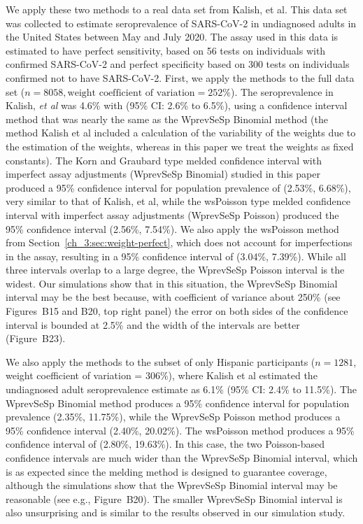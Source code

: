 We apply these two methods to a real data set from Kalish, et al.\cite{Kali:2021}
This data set was collected to estimate seroprevalence of SARS-CoV-2 in undiagnosed adults in the United States between May and July 2020.
The assay used in this data is estimated to have perfect sensitivity, based on 56 tests on individuals with confirmed SARS-CoV-2 and perfect specificity based on 300 tests on individuals confirmed not to have SARS-CoV-2.
First, we apply the methods to the full data set (\( n = 8058, \text{weight coefficient of variation} = 252\%\)).
The seroprevalence in Kalish, {\it et al } was 4.6\% with (95\% CI: 2.6\% to 6.5\%), using a confidence interval method that was nearly the same as the WprevSeSp Binomial method (the method Kalish et al included a calculation of the variability of the weights due to the estimation of the weights, whereas in this paper we treat the weights as fixed constants).
The Korn and Graubard type melded confidence interval with imperfect assay adjustments (WprevSeSp Binomial) studied in this paper produced a 95\% confidence interval for population prevalence of (2.53\%, 6.68\%), very similar to that of Kalish, et al, while the wsPoisson type melded confidence interval with imperfect assay adjustments (WprevSeSp Poisson) produced the 95\% confidence interval (2.56\%, 7.54\%).
We also apply the wsPoisson method from Section~\ref{ch_3:sec:weight-perfect}, which does not account for imperfections in the assay, resulting in a 95\% confidence interval of (3.04\%, 7.39\%).
While all three intervals overlap to a large degree, the WprevSeSp Poisson interval is the widest.
Our simulations show that in this situation, the WprevSeSp Binomial interval may be the best because, with coefficient of variance about 250\% (see Figures~B15 and B20, top right panel) the error on both sides of the confidence interval is bounded at 2.5\% and the width of the intervals are better (Figure~B23).


We also apply the methods to the subset of only Hispanic participants (\( n = 1281 \), weight coefficient of variation = 306\%), where Kalish et al estimated the undiagnosed adult seroprevalence estimate as 6.1\% (95\% CI: 2.4\% to 11.5\%).
The WprevSeSp Binomial method produces a 95\% confidence interval for population prevalence (2.35\%, 11.75\%), while the WprevSeSp Poisson method produces a 95\% confidence interval (2.40\%, 20.02\%).
The wsPoisson method produces a 95\% confidence interval of (2.80\%, 19.63\%).
In this case, the two Poisson-based confidence intervals are much wider than the WprevSeSp Binomial interval, which is as expected since the melding method is designed to guarantee coverage, although the simulations show that the WprevSeSp Binomial interval may be reasonable (see e.g., Figure~B20).
The smaller WprevSeSp Binomial interval is also unsurprising and is similar to the results observed in our simulation study.


